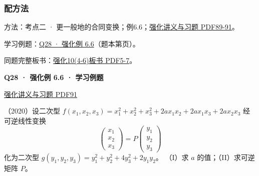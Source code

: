 \documentclass[UTF8,fontset=fandol,11pt,a4paper]{ctexart}
\newcommand{\source}[1]{{\footnotesize\color{Muted}#1\par}}
\newcommand{\qtitle}[2]{\par\needspace{5\baselineskip}\hypertarget{#1}{}\label{#1}\textbf{#2}\par}
\begin{document}
\subsubsection*{配方法}
\hypertarget{node-A4C}{}
方法：考点二 · 更一般地的合同变换；例6.6；\href{file:///Users/skyintelligence/Desktop/\%E5\%BE\%97\%E8\%AF\%BB\%E4\%B8\%AA\%E7\%A0\%94-\%E5\%8C\%97\%E5\%A4\%A7\%E8\%BD\%AF\%E5\%BE\%AE/\%E6\%95\%B0\%E5\%AD\%A6\%20150/Kira\%C2\%B727\%E7\%BA\%BF\%E6\%80\%A7\%E4\%BB\%A3\%E6\%95\%B0\%E5\%BC\%BA\%E5\%8C\%96\%E8\%AE\%B2\%E4\%B9\%89\%2B\%E4\%B9\%A0\%E9\%A2\%98.pdf\#page=89}{强化讲义与习题 PDF89-91}。\par
学习例题：\hyperlink{R-EX-06}{Q28 · 强化例 6.6}（题本第\pageref*{R-EX-06}页）。\par
同题完整板书：\href{file:///Users/skyintelligence/Desktop/\%E5\%BE\%97\%E8\%AF\%BB\%E4\%B8\%AA\%E7\%A0\%94-\%E5\%8C\%97\%E5\%A4\%A7\%E8\%BD\%AF\%E5\%BE\%AE/\%E6\%95\%B0\%E5\%AD\%A6\%20150/\%E7\%BA\%BF\%E6\%80\%A7\%E4\%BB\%A3\%E6\%95\%B0/\%E7\%BA\%BF\%E4\%BB\%A3\%E5\%BC\%BA\%E5\%8C\%9610\%284-6\%29\%20\%20\%E7\%AC\%AC\%E5\%85\%AD\%E7\%AB\%A0\%20\%E4\%BA\%8C\%E6\%AC\%A1\%E5\%9E\%8B2\%E3\%80\%90\%E4\%BE\%8B6.5\%E3\%80\%91-\%E3\%80\%90\%E4\%BE\%8B6.13\%E3\%80\%91.pdf\#page=5}{强化10(4-6)板书 PDF5-7}。\par
\vspace{3mm}
\begin{minipage}{\linewidth}
\qtitle{R-EX-06}{Q28 · 强化例 6.6 · 学习例题}
\source{\href{file:///Users/skyintelligence/Desktop/\%E5\%BE\%97\%E8\%AF\%BB\%E4\%B8\%AA\%E7\%A0\%94-\%E5\%8C\%97\%E5\%A4\%A7\%E8\%BD\%AF\%E5\%BE\%AE/\%E6\%95\%B0\%E5\%AD\%A6\%20150/Kira\%C2\%B727\%E7\%BA\%BF\%E6\%80\%A7\%E4\%BB\%A3\%E6\%95\%B0\%E5\%BC\%BA\%E5\%8C\%96\%E8\%AE\%B2\%E4\%B9\%89\%2B\%E4\%B9\%A0\%E9\%A2\%98.pdf\#page=91}{强化讲义与习题 PDF91}}
（2020）设二次型 $f(x_1,x_2,x_3)=x_1^2+x_2^2+x_3^2+2ax_1x_2+2ax_1x_3+2ax_2x_3$ 经可逆线性变换
\[\begin{pmatrix}x_1\\x_2\\x_3\end{pmatrix}=P\begin{pmatrix}y_1\\y_2\\y_3\end{pmatrix}\]
化为二次型 $g(y_1,y_2,y_3)=y_1^2+y_2^2+4y_3^2+2y_1y_2$。
（I）求 $a$ 的值；（II）求可逆矩阵 $P$。
\end{minipage}\par\vspace{7mm}
\end{document}
